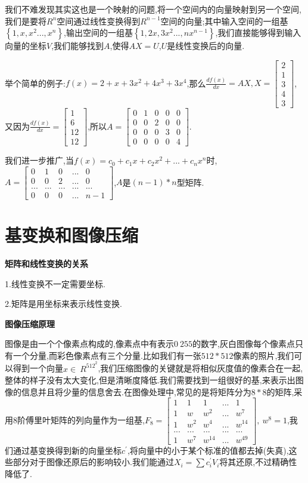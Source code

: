 \documentclass[oneside]{book}
\begin{document}
	我们不难发现其实这也是一个映射的问题,将一个空间内的向量映射到另一个空间,我们是要将$R^{n}$空间通过线性变换得到$R^{n-1}$空间的向量;其中输入空间的一组基$\left\lbrace 1,x,x^{2}...,x^{n} \right\rbrace$,输出空间的一组基$\left\lbrace 1,2x,3x^{2}...,nx^{n-1}\right\rbrace $,我们直接能够得到输入向量的坐标$V$,我们能够找到$A$,使得$AX=U$,$U$是线性变换后的向量.
	
	举个简单的例子:$f(x)=2+x+3x^{2}+4x^{3}+3x^{4}$,那么$\frac{df(x)}{dx}=AX,X=\left[\begin{array}{c}
		2\\1\\3\\4\\3
	\end{array}\right]$,又因为$\frac{df(x)}{dx}=\left[\begin{array}{c}
	1\\6\\12\\12
\end{array}\right]$,所以$A=\left[\begin{array}{ccccc}
0&1&0&0&0\\0&0&2&0&0\\0&0&0&3&0\\0&0&0&0&4
\end{array}\right]$.

我们进一步推广,当$f(x)=c_{0}+c_{1}x+c_{2}x^{2}+...+c_{n}x^{n}$时,$A=\left[\begin{array}{ccccc}
	0&1&0&...&0\\0&0&2&...&0\\...&...&...&...&...\\0&0&0&...&n-1
\end{array}\right]$,$A$是$(n-1)*n$型矩阵.
	\chapter{基变换和图像压缩}
	\textbf{矩阵和线性变换的关系}
	
	1.线性变换不一定需要坐标.
	
	2.矩阵是用坐标来表示线性变换.
	
	\textbf{图像压缩原理}
	
	图像是由一个个像素点构成的,像素点中有表示$0~255$的数字,灰白图像每个像素点只有一个分量,而彩色像素点有三个分量.比如我们有一张$512*512$像素的照片,我们可以得到一个向量$x\in \ R^{512^{2}}$,我们压缩图像的关键就是将相似灰度值的像素合在一起,整体的样子没有太大变化,但是清晰度降低.我们需要找到一组很好的基,来表示出图像的信息并且将少量的信息舍去.在图像处理中,常见的是将矩阵分为$8*8$的矩阵,采用$8$阶傅里叶矩阵的列向量作为一组基,$F_{8}=\left[\begin{array}{ccccc}
		1&1&1&...&1\\1&w&w^{2}&...&w^{7}\\1&w^{2}&w^{4}&...&w^{14}\\...&...&...&...&...\\1&w^{7}&w^{14}&...&w^{49}
	\end{array}\right],\ w^{8}=1$,我们通过基变换得到新的向量坐标$c^{'}$,将向量中的小于某个标准的值都去掉(失真),这些部分对于图像还原后的影响较小.我们能通过$X_{i}=\sum c^{'}_{i}V_{i}$将其还原,不过精确性降低了.
\end{document}
